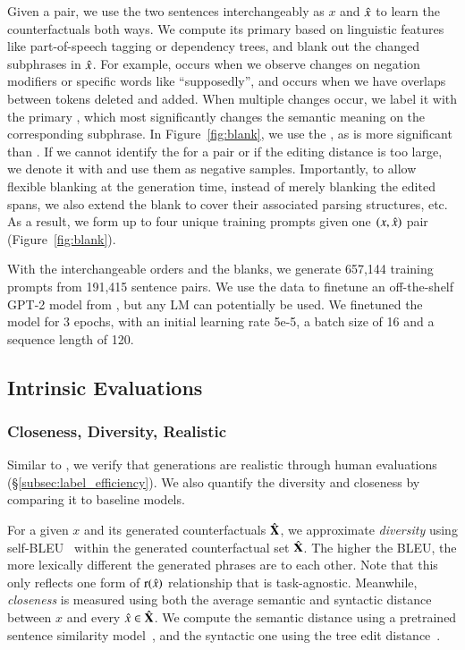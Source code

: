Given a pair, we use the two sentences interchangeably as $x$ and $\hat{x}$ to learn the counterfactuals both ways.
We compute its primary \tagstr based on linguistic features like part-of-speech tagging or dependency trees, and blank out the changed subphrases in $\hat{x}$.
For example,  occurs when we observe changes on negation modifiers or specific words like ``supposedly'', and  occurs when we have overlaps between tokens deleted and added.
When multiple changes occur, we label it with the primary \tagstr, which most significantly changes the semantic meaning on the corresponding subphrase.
In Figure~\ref{fig:blank}, we use the \tagstrshort {}, as  is more significant than .
If we cannot identify the \tagstr for a pair or if the editing distance is too large, we denote it with  and use them as negative samples.
Importantly, to allow flexible blanking at the generation time, instead of merely blanking the edited spans, we also extend the blank to cover their associated parsing structures, etc.
As a result, we form up to four unique training prompts given one $(x, \hat{x})$ pair (Figure~\ref{fig:blank}).


With the interchangeable orders and the blanks, we generate 657,144 training prompts from 191,415 sentence pairs.
We use the data to finetune an off-the-shelf GPT-2 model from \citet{Wolf2019HuggingFacesTS}, but any LM can potentially be used.
We finetuned the model for 3 epochs, with an initial learning rate 5e-5, a batch size of 16 and a sequence length of 120.


\subsection{Intrinsic Evaluations}
\label{appendix:intrinsic}
\subsubsection{Closeness, Diversity, Realistic}

Similar to \citet{madaan2020generate}, we verify that \sysname generations are realistic through human evaluations (\S\ref{subsec:label_efficiency}).
We also quantify the diversity and closeness by comparing it to baseline models.

For a given $x$ and its generated counterfactuals $\hat{\mathbf{X}}$, we approximate \emph{diversity} using self-BLEU~\cite{malandrakis-etal-2019-controlled, zhu2018texygen} within the generated counterfactual set $\hat{\mathbf{X}}$.
The higher the BLEU, the more lexically different the generated phrases are to each other.
Note that this only reflects one form of $\operatorname*{r}(\hat{x})$ relationship that is task-agnostic. 
Meanwhile, \emph{closeness} is measured using both the average semantic and syntactic distance between $x$ and every $\hat{x} \in \hat{\mathbf{X}}$.
We compute the semantic distance using a pretrained sentence similarity model~\cite{reimers-2019-sentence-bert}, and the syntactic one using the tree edit distance~\cite{zhang1989simple}.


